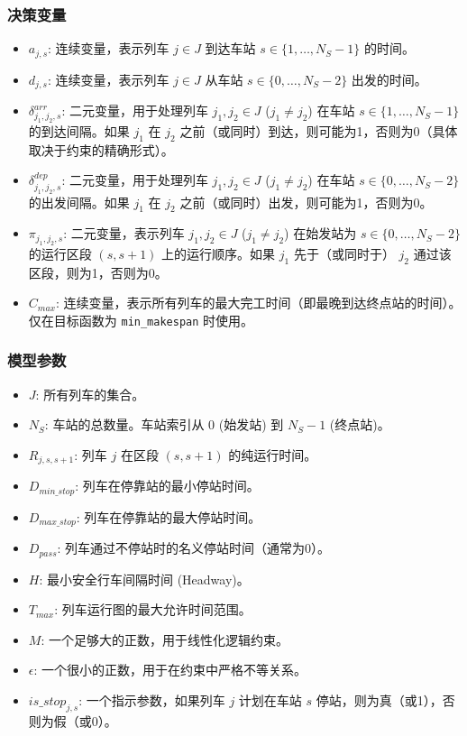 \documentclass{article}
\begin{document}
    \subsubsection{决策变量}
    \begin{itemize}
        \item $a_{j,s}$: 连续变量，表示列车 $j \in J$ 到达车站 $s \in \{1, \dots, N_S-1\}$ 的时间。
        \item $d_{j,s}$: 连续变量，表示列车 $j \in J$ 从车站 $s \in \{0, \dots, N_S-2\}$ 出发的时间。
        \item $\delta^{arr}_{j_1,j_2,s}$: 二元变量，用于处理列车 $j_1, j_2 \in J$
        ($j_1 \neq j_2$) 在车站 $s \in \{1, \dots, N_S-1\}$ 的到达间隔。如果
        $j_1$ 在 $j_2$ 之前（或同时）到达，则可能为1，否则为0（具体取决于约束的精确形式）。
        \item $\delta^{dep}_{j_1,j_2,s}$: 二元变量，用于处理列车 $j_1, j_2 \in J$
        ($j_1 \neq j_2$) 在车站 $s \in \{0, \dots, N_S-2\}$ 的出发间隔。如果
        $j_1$ 在 $j_2$ 之前（或同时）出发，则可能为1，否则为0。
        \item $\pi_{j_1,j_2,s}$: 二元变量，表示列车 $j_1, j_2 \in J$ ($j_1 \neq
        j_2$) 在始发站为 $s \in \{0, \dots, N_S-2\}$ 的运行区段 $(s, s+1)$
        上的运行顺序。如果 $j_1$ 先于（或同时于） $j_2$ 通过该区段，则为1，否则为0。
        \item $C_{max}$: 连续变量，表示所有列车的最大完工时间（即最晚到达终点站的时间）。仅在目标函数为
        \texttt{min\_makespan} 时使用。
    \end{itemize}

    \subsubsection{模型参数}
    \begin{itemize}
        \item $J$: 所有列车的集合。
        \item $N_S$: 车站的总数量。车站索引从 $0$ (始发站) 到 $N_S-1$ (终点站)。
        \item $R_{j,s,s+1}$: 列车 $j$ 在区段 $(s, s+1)$ 的纯运行时间。
        \item $D_{min\_stop}$: 列车在停靠站的最小停站时间。
        \item $D_{max\_stop}$: 列车在停靠站的最大停站时间。
        \item $D_{pass}$: 列车通过不停站时的名义停站时间（通常为0）。
        \item $H$: 最小安全行车间隔时间 (Headway)。
        \item $T_{max}$: 列车运行图的最大允许时间范围。
        \item $M$: 一个足够大的正数，用于线性化逻辑约束。
        \item $\epsilon$: 一个很小的正数，用于在约束中严格不等关系。
        \item $is\_stop_{j,s}$: 一个指示参数，如果列车 $j$ 计划在车站 $s$ 停站，则为真（或1），否则为假（或0）。
    \end{itemize}
\end{document}

